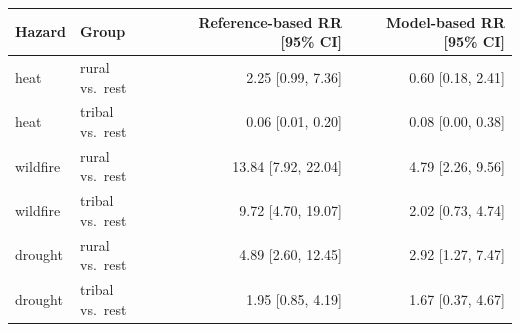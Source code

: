 \begin{tabular}{llrr}\toprule
Hazard & Group & Reference-based RR [95\% CI] & Model-based RR [95\% CI]\\\midrule
heat & rural vs.\ rest & 2.25 [0.99, 7.36] & 0.60 [0.18, 2.41]\\
heat & tribal vs.\ rest & 0.06 [0.01, 0.20] & 0.08 [0.00, 0.38]\\
wildfire & rural vs.\ rest & 13.84 [7.92, 22.04] & 4.79 [2.26, 9.56]\\
wildfire & tribal vs.\ rest & 9.72 [4.70, 19.07] & 2.02 [0.73, 4.74]\\
drought & rural vs.\ rest & 4.89 [2.60, 12.45] & 2.92 [1.27, 7.47]\\
drought & tribal vs.\ rest & 1.95 [0.85, 4.19] & 1.67 [0.37, 4.67]\\
\bottomrule\end{tabular}
